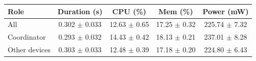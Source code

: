 \begin{tabular}{lcccc}
\hline
\textbf{Role} & \textbf{Duration (s)} & \textbf{CPU (\%)} & \textbf{Mem (\%)} & \textbf{Power (mW)} \\
\hline
All & 0.302 $\pm$ 0.033 & 12.63 $\pm$ 0.65 & 17.25 $\pm$ 0.32 & 225.74 $\pm$ 7.32 \\
Coordinator & 0.293 $\pm$ 0.032 & 14.43 $\pm$ 0.42 & 18.13 $\pm$ 0.21 & 237.01 $\pm$ 8.28 \\
Other devices & 0.303 $\pm$ 0.033 & 12.48 $\pm$ 0.39 & 17.18 $\pm$ 0.20 & 224.80 $\pm$ 6.43 \\
\hline
\end{tabular}
